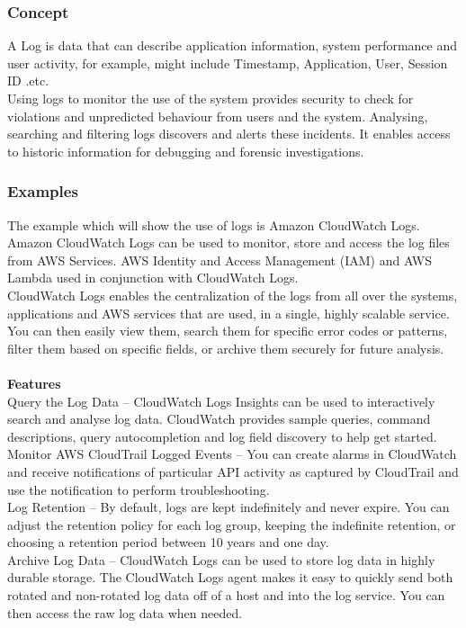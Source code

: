 \documentclass[10pt]{article}
\begin{document}
\subsubsection{Concept}
A Log is data that can describe application information, system performance and user activity, for example, might include Timestamp, Application, User, Session ID .etc.
\\
Using logs to monitor the use of the system provides security to check for violations and unpredicted behaviour from users and the system. Analysing, searching and filtering logs discovers and alerts these incidents. It enables access to historic information for debugging and forensic investigations.
\subsubsection{Examples}
The example which will show the use of logs is Amazon CloudWatch Logs. Amazon CloudWatch Logs can be used to monitor, store and access the log files from AWS Services. AWS Identity and Access Management (IAM) and AWS Lambda used in conjunction with CloudWatch Logs.
\\
CloudWatch Logs enables the centralization of the logs from all over the systems, applications and AWS services that are used, in a single, highly scalable service. You can then easily view them, search them for specific error codes or patterns, filter them based on specific fields, or archive them securely for future analysis. 
\\\\\textbf{Features} \\
Query the Log Data – CloudWatch Logs Insights can be used to interactively search and analyse log data. CloudWatch provides sample queries, command descriptions, query autocompletion and log field discovery to help get started. 
\\
Monitor AWS CloudTrail Logged Events – You can create alarms in CloudWatch and receive notifications of particular API activity as captured by CloudTrail and use the notification to perform troubleshooting.
\\
Log Retention – By default, logs are kept indefinitely and never expire. You can adjust the retention policy for each log group, keeping the indefinite retention, or choosing a retention period between 10 years and one day.
\\
Archive Log Data – CloudWatch Logs can be used to store log data in highly durable storage. The CloudWatch Logs agent makes it easy to quickly send both rotated and non-rotated log data off of a host and into the log service. You can then access the raw log data when needed.
\newpage
\end{document}
